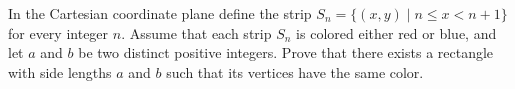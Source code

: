 In the Cartesian coordinate plane define the strip $S_n = \{(x, y) \mid n \leq x < n + 1\}$ for every integer $n$. Assume that each strip $S_n$ is colored either red or blue, and let $a$ and $b$ be two distinct positive integers. Prove that there exists a rectangle with side lengths $a$ and $b$ such that its vertices have the same color.
